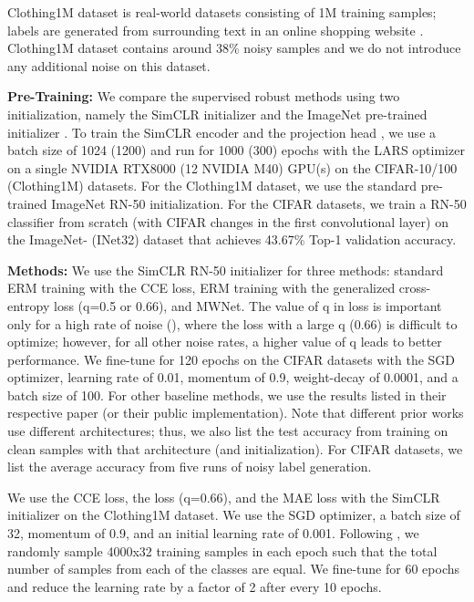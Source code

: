 \documentclass[final]{cvpr}
\begin{document}
Clothing1M dataset is real-world datasets consisting of 1M training samples; labels are generated from surrounding text in an online shopping website \cite{xiao2015learning}. Clothing1M dataset contains around 38\% noisy samples \cite{c2d} and we do not introduce any additional noise on this dataset.




{\bf Pre-Training:} We compare the supervised robust methods using two initialization, namely the SimCLR initializer and the ImageNet pre-trained initializer \cite{pretraining}. 
To train the SimCLR encoder  and the projection head , we use a batch size of 1024 (1200) and run for 1000 (300) epochs  with the LARS optimizer \cite{lars} on a single NVIDIA RTX8000 (12 NVIDIA M40) GPU(s) on the CIFAR-10/100 (Clothing1M) datasets. 
For the Clothing1M dataset, we use the standard pre-trained ImageNet RN-50 initialization. For the CIFAR datasets, we train a RN-50 classifier from scratch (with CIFAR changes in the first convolutional layer) on the ImageNet- (INet32) dataset \cite{imagenet32} that achieves 43.67\% Top-1 validation accuracy. 

{\bf Methods:}
 We use the SimCLR RN-50 initializer for three methods: standard ERM training with the CCE loss, ERM training with the generalized cross-entropy loss   (q=0.5 or 0.66), and MWNet. The value of q in  loss is important only for a high rate of noise (), where the  loss with a large q (0.66) is difficult to optimize; however, for all other noise rates, a higher value of q leads to better performance. We fine-tune for 120 epochs on the CIFAR datasets with the SGD optimizer, learning rate of 0.01, momentum of 0.9, weight-decay of 0.0001, and a batch size of 100.
For other baseline methods, we use the results listed in their respective paper (or their public implementation). 
Note that 
different prior works use different architectures; thus, we also list the test accuracy from training on clean samples with that architecture (and initialization).  
For CIFAR datasets, we list the average accuracy from five runs of noisy label generation.  

We use the CCE loss, the  loss (q=0.66), and the MAE loss with the SimCLR initializer on the Clothing1M dataset. We use the SGD optimizer, a batch size of 32, momentum of 0.9, and an initial learning rate of 0.001. Following \cite{elr,dividemix}, we randomly sample 4000x32 training samples in each epoch such that the total number of samples from each of the classes are equal. We fine-tune for 60 epochs and reduce the learning rate by a factor of 2 after every 10 epochs.
\end{document}
